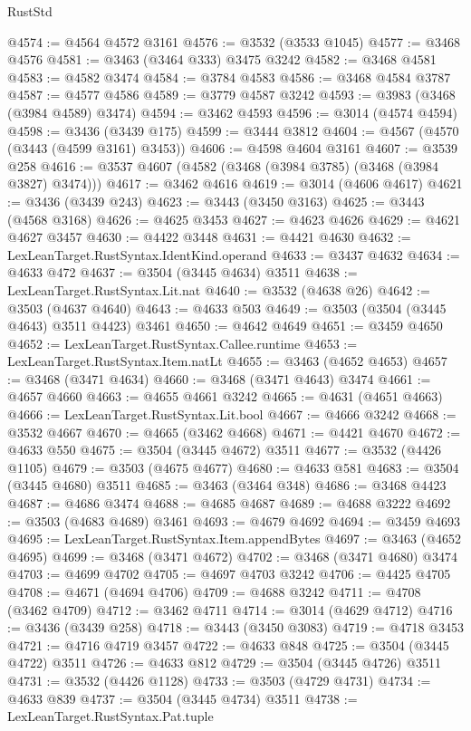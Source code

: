 \begin{lexlean}{RustStd}
\begin{coremodule}
@4574 := @4564 @4572 @3161
@4576 := @3532 (@3533 @1045)
@4577 := @3468 @4576
@4581 := @3463 (@3464 @333) @3475 @3242
@4582 := @3468 @4581
@4583 := @4582 @3474
@4584 := @3784 @4583
@4586 := @3468 @4584 @3787
@4587 := @4577 @4586
@4589 := @3779 @4587 @3242
@4593 := @3983 (@3468 (@3984 @4589) @3474)
@4594 := @3462 @4593
@4596 := @3014 (@4574 @4594)
@4598 := @3436 (@3439 @175)
@4599 := @3444 @3812
@4604 := @4567 (@4570 (@3443 (@4599 @3161) @3453))
@4606 := @4598 @4604 @3161
@4607 := @3539 @258
@4616 := @3537 @4607 (@4582 (@3468 (@3984 @3785) (@3468 (@3984 @3827) @3474)))
@4617 := @3462 @4616
@4619 := @3014 (@4606 @4617)
@4621 := @3436 (@3439 @243)
@4623 := @3443 (@3450 @3163)
@4625 := @3443 (@4568 @3168)
@4626 := @4625 @3453
@4627 := @4623 @4626
@4629 := @4621 @4627 @3457
@4630 := @4422 @3448
@4631 := @4421 @4630
@4632 := LexLeanTarget.RustSyntax.IdentKind.operand
@4633 := @3437 @4632
@4634 := @4633 @472
@4637 := @3504 (@3445 @4634) @3511
@4638 := LexLeanTarget.RustSyntax.Lit.nat
@4640 := @3532 (@4638 @26)
@4642 := @3503 (@4637 @4640)
@4643 := @4633 @503
@4649 := @3503 (@3504 (@3445 @4643) @3511 @4423) @3461
@4650 := @4642 @4649
@4651 := @3459 @4650
@4652 := LexLeanTarget.RustSyntax.Callee.runtime
@4653 := LexLeanTarget.RustSyntax.Item.natLt
@4655 := @3463 (@4652 @4653)
@4657 := @3468 (@3471 @4634)
@4660 := @3468 (@3471 @4643) @3474
@4661 := @4657 @4660
@4663 := @4655 @4661 @3242
@4665 := @4631 (@4651 @4663)
@4666 := LexLeanTarget.RustSyntax.Lit.bool
@4667 := @4666 @3242
@4668 := @3532 @4667
@4670 := @4665 (@3462 @4668)
@4671 := @4421 @4670
@4672 := @4633 @550
@4675 := @3504 (@3445 @4672) @3511
@4677 := @3532 (@4426 @1105)
@4679 := @3503 (@4675 @4677)
@4680 := @4633 @581
@4683 := @3504 (@3445 @4680) @3511
@4685 := @3463 (@3464 @348)
@4686 := @3468 @4423
@4687 := @4686 @3474
@4688 := @4685 @4687
@4689 := @4688 @3222
@4692 := @3503 (@4683 @4689) @3461
@4693 := @4679 @4692
@4694 := @3459 @4693
@4695 := LexLeanTarget.RustSyntax.Item.appendBytes
@4697 := @3463 (@4652 @4695)
@4699 := @3468 (@3471 @4672)
@4702 := @3468 (@3471 @4680) @3474
@4703 := @4699 @4702
@4705 := @4697 @4703 @3242
@4706 := @4425 @4705
@4708 := @4671 (@4694 @4706)
@4709 := @4688 @3242
@4711 := @4708 (@3462 @4709)
@4712 := @3462 @4711
@4714 := @3014 (@4629 @4712)
@4716 := @3436 (@3439 @258)
@4718 := @3443 (@3450 @3083)
@4719 := @4718 @3453
@4721 := @4716 @4719 @3457
@4722 := @4633 @848
@4725 := @3504 (@3445 @4722) @3511
@4726 := @4633 @812
@4729 := @3504 (@3445 @4726) @3511
@4731 := @3532 (@4426 @1128)
@4733 := @3503 (@4729 @4731)
@4734 := @4633 @839
@4737 := @3504 (@3445 @4734) @3511
@4738 := LexLeanTarget.RustSyntax.Pat.tuple

\end{coremodule}
\end{lexlean}
